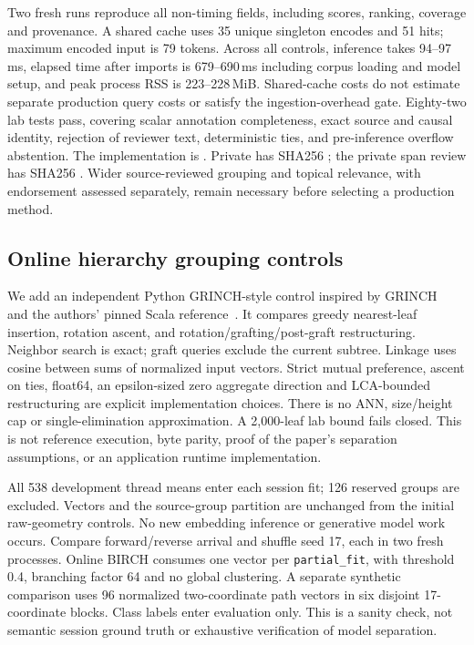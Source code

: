 \documentclass[11pt]{article}
\begin{document}
Two fresh runs reproduce all non-timing fields, including scores, ranking,
coverage and provenance. A shared cache uses 35 unique singleton encodes and
51 hits; maximum encoded input is 79 tokens. Across all controls, inference takes
94--97\,ms, elapsed time after imports is 679--690\,ms including corpus loading
and model setup, and peak process RSS is 223--228\,MiB. Shared-cache costs do not
estimate separate production query costs or satisfy the ingestion-overhead gate.
Eighty-two lab tests pass, covering scalar annotation completeness, exact source
and causal identity, rejection of reviewer text, deterministic ties, and
pre-inference overflow abstention. The implementation is
. Private
 has SHA256
;
the private span review has SHA256
.
Wider source-reviewed grouping and topical relevance, with endorsement assessed
separately, remain necessary before selecting a production method.

\subsection{Online hierarchy grouping controls}
We add an independent Python GRINCH-style control inspired by
GRINCH~\cite{grinch} and the authors' pinned Scala reference~\cite{grinchreference}.
It compares greedy nearest-leaf insertion, rotation ascent, and
rotation/grafting/post-graft restructuring. Neighbor search is exact; graft
queries exclude the current subtree. Linkage uses cosine between sums of
normalized input vectors. Strict mutual preference, ascent on ties, float64,
an epsilon-sized zero aggregate direction and LCA-bounded restructuring are
explicit implementation choices. There is no ANN, size/height cap or
single-elimination approximation. A 2,000-leaf lab bound fails closed. This is
not reference execution, byte parity, proof of the paper's separation assumptions,
or an application runtime implementation.

All 538 development thread means enter each session fit; 126 reserved groups
are excluded. Vectors and the source-group partition are unchanged from the
initial raw-geometry controls. No new embedding inference or generative model
work occurs. Compare forward/reverse arrival and shuffle seed 17, each in two
fresh processes. Online BIRCH consumes one vector per \texttt{partial\_fit},
with threshold 0.4, branching factor 64 and no global clustering. A separate
synthetic comparison uses 96 normalized two-coordinate path vectors in six
disjoint 17-coordinate blocks. Class labels enter evaluation only. This is a
sanity check, not semantic session ground truth or exhaustive verification of
model separation.
\end{document}
